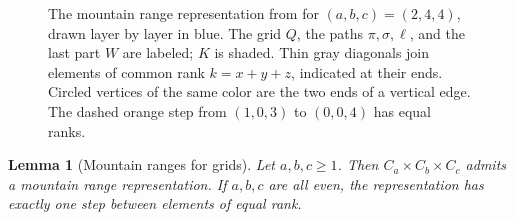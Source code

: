 \documentclass[fontsize=11pt,a4paper,DIV=12]{scrartcl}
\newtheorem{lemma}[theorem]{Lemma}
\begin{document}
\begin{figure}
	\centering
	
	\caption{The mountain range representation from  for $(a,b,c)=(2,4,4)$, drawn layer by layer in blue. The grid $Q$, the paths $\pi,\sigma,\ell$, and the last part $W$ are labeled; $K$ is shaded. Thin gray diagonals join elements of common rank $k=x+y+z$, indicated at their ends. Circled vertices of the same color are the two ends of a vertical edge. The dashed orange step from $(1,0,3)$ to $(0,0,4)$ has equal ranks.}
	\label{fig:3dgrid mountain}
\end{figure}

\begin{lemma}[Mountain ranges for grids]
	\label{lem:grid-mountain-seed}
	Let $a,b,c\ge 1$. Then $C_a\times C_b\times C_c$ admits a mountain range representation. If $a,b,c$ are all even, the representation has exactly one step between elements of equal rank.
\end{lemma}
\nopagebreak[4]
\end{document}
